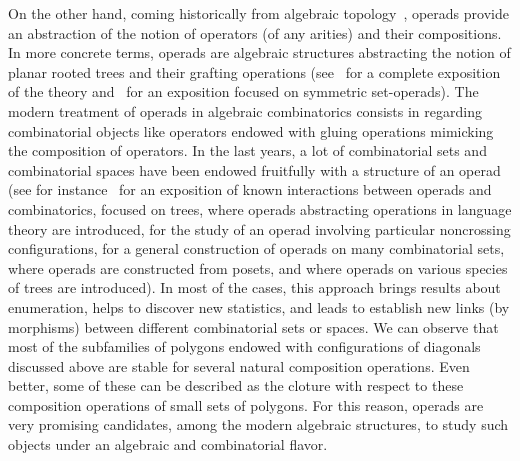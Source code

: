 \documentclass[10pt,reqno]{amsart}
\numberwithin{equation}{subsection}
\begin{document}
On the other hand, coming historically from algebraic
topology~\cite{May72,BV73}, operads provide an abstraction of the notion
of operators (of any arities) and their compositions. In more concrete
terms, operads are algebraic structures abstracting the notion of planar
rooted trees and their grafting operations (see~\cite{LV12} for a
complete exposition of the theory and~\cite{Men15} for an exposition
focused on symmetric set-operads). The modern treatment of operads in
algebraic combinatorics consists in regarding combinatorial objects like
operators endowed with gluing operations mimicking the composition of
operators. In the last years, a lot of combinatorial sets and
combinatorial spaces have been endowed fruitfully with a structure of an
operad (see for instance~\cite{Cha08} for an exposition of known
interactions between operads and combinatorics, focused on trees,
\cite{LMN13,GLMN16} where operads abstracting operations in language
theory are introduced, \cite{CG14} for the study of an operad involving
particular noncrossing configurations, \cite{Gir15} for a general
construction of operads on many combinatorial sets, \cite{Gir16b} where
operads are constructed from posets, and \cite{CHN16} where operads on
various species of trees are introduced). In most of the cases, this
approach brings results about enumeration, helps to discover new
statistics, and leads to establish new links (by morphisms) between
different combinatorial sets or spaces. We can observe that most of the
subfamilies of polygons endowed with configurations of diagonals
discussed above are stable for several natural composition operations.
Even better, some of these can be described as the cloture with respect
to these composition operations of small sets of polygons. For this
reason, operads are very promising candidates, among the modern
algebraic structures, to study such objects under an algebraic and
combinatorial flavor.
\smallskip
\end{document}
